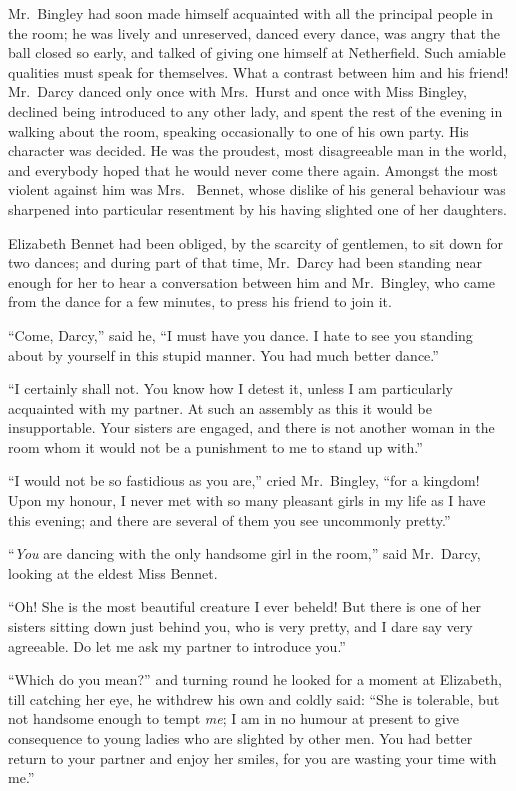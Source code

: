 Mr.\ Bingley had soon made himself acquainted with all the
principal people in the room; he was lively and unreserved,
danced every dance, was angry that the ball closed so early,
and talked of giving one himself at Netherfield.  Such amiable
qualities must speak for themselves.  What a contrast between
him and his friend!  Mr.\ Darcy danced only once with Mrs.\ Hurst
and once with Miss Bingley, declined being introduced to any
other lady, and spent the rest of the evening in walking about
the room, speaking occasionally to one of his own party.  His
character was decided.  He was the proudest, most disagreeable
man in the world, and everybody hoped that he would never come
there again.  Amongst the most violent against him was Mrs.\ %
Bennet, whose dislike of his general behaviour was sharpened
into particular resentment by his having slighted one of her
daughters.

Elizabeth Bennet had been obliged, by the scarcity of gentlemen,
to sit down for two dances; and during part of that time,
Mr.\ Darcy had been standing near enough for her to hear a
conversation between him and Mr.\ Bingley, who came from the
dance for a few minutes, to press his friend to join it.

``Come, Darcy,'' said he, ``I must have you dance.  I hate to see
you standing about by yourself in this stupid manner.  You had
much better dance.''

``I certainly shall not.  You know how I detest it, unless I am
particularly acquainted with my partner.  At such an assembly as
this it would be insupportable.  Your sisters are engaged, and
there is not another woman in the room whom it would not be a
punishment to me to stand up with.''

``I would not be so fastidious as you are,'' cried Mr.\ Bingley,
``for a kingdom!  Upon my honour, I never met with so many
pleasant girls in my life as I have this evening; and there are
several of them you see uncommonly pretty.''

``\emph{You} are dancing with the only handsome girl in the room,''
said Mr.\ Darcy, looking at the eldest Miss Bennet.

``Oh! She is the most beautiful creature I ever beheld!  But
there is one of her sisters sitting down just behind you, who is
very pretty, and I dare say very agreeable.  Do let me ask my
partner to introduce you.''

``Which do you mean?'' and turning round he looked for a
moment at Elizabeth, till catching her eye, he withdrew his own
and coldly said: ``She is tolerable, but not handsome enough to
tempt \emph{me}; I am in no humour at present to give consequence
to young ladies who are slighted by other men.  You had better
return to your partner and enjoy her smiles, for you are wasting
your time with me.''


